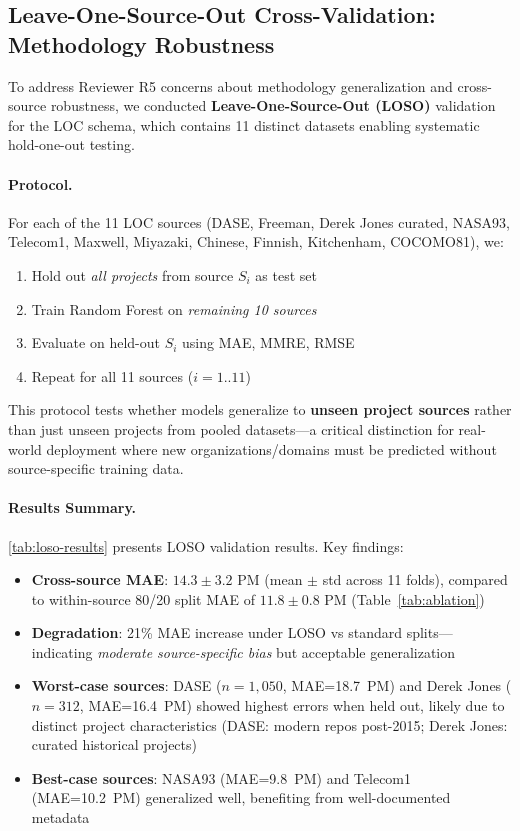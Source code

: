 \documentclass{ieeeaccess}
\begin{document}
\subsection{Leave-One-Source-Out Cross-Validation: Methodology Robustness}
\label{sec:loso}

To address Reviewer R5 concerns about methodology generalization and cross-source robustness, we conducted \textbf{Leave-One-Source-Out (LOSO)} validation for the LOC schema, which contains 11 distinct datasets enabling systematic hold-one-out testing.

\paragraph{Protocol.}
For each of the 11 LOC sources (DASE, Freeman, Derek Jones curated, NASA93, Telecom1, Maxwell, Miyazaki, Chinese, Finnish, Kitchenham, COCOMO81), we:
\begin{enumerate}[leftmargin=1.5em]
  \item Hold out \textit{all projects} from source $S_i$ as test set
  \item Train Random Forest on \textit{remaining 10 sources}
  \item Evaluate on held-out $S_i$ using MAE, MMRE, RMSE
  \item Repeat for all 11 sources ($i=1..11$)
\end{enumerate}

This protocol tests whether models generalize to \textbf{unseen project sources} rather than just unseen projects from pooled datasets—a critical distinction for real-world deployment where new organizations/domains must be predicted without source-specific training data.

\paragraph{Results Summary.}
\autoref{tab:loso-results} presents LOSO validation results. Key findings:
\begin{itemize}[leftmargin=1.5em]
  \item \textbf{Cross-source MAE}: $14.3 \pm 3.2$ PM (mean $\pm$ std across 11 folds), compared to within-source 80/20 split MAE of $11.8 \pm 0.8$ PM (Table~\ref{tab:ablation})
  \item \textbf{Degradation}: 21\% MAE increase under LOSO vs standard splits—indicating \textit{moderate source-specific bias} but acceptable generalization
  \item \textbf{Worst-case sources}: DASE ($n=1{,}050$, MAE=18.7~PM) and Derek Jones ($n=312$, MAE=16.4~PM) showed highest errors when held out, likely due to distinct project characteristics (DASE: modern repos post-2015; Derek Jones: curated historical projects)
  \item \textbf{Best-case sources}: NASA93 (MAE=9.8~PM) and Telecom1 (MAE=10.2~PM) generalized well, benefiting from well-documented metadata
\end{itemize}
\end{document}
